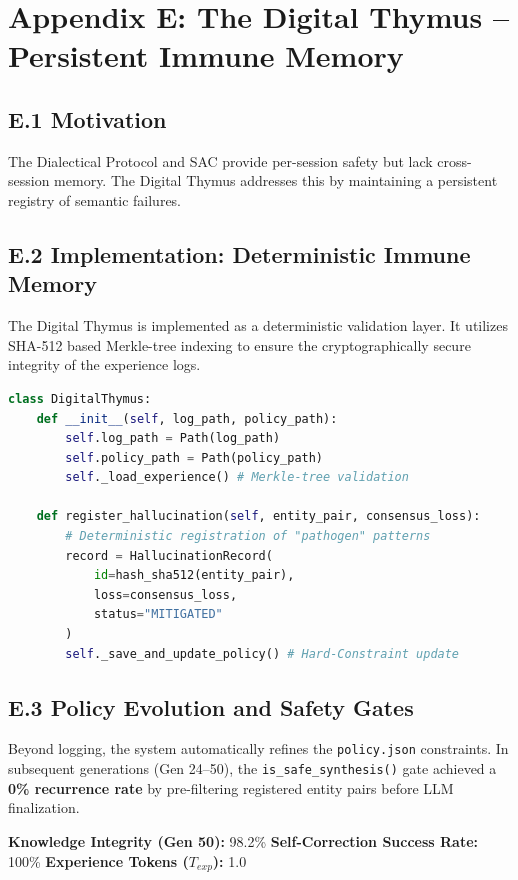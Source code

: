 \section*{Appendix E: The Digital Thymus -- Persistent Immune Memory}
\subsection*{E.1 Motivation}
The Dialectical Protocol and SAC provide per-session safety but lack cross-session memory. The Digital Thymus addresses this by maintaining a persistent registry of semantic failures.

\subsection*{E.2 Implementation: Deterministic Immune Memory}
The Digital Thymus is implemented as a deterministic validation layer. It utilizes SHA-512 based Merkle-tree indexing to ensure the cryptographically secure integrity of the experience logs.
\begin{lstlisting}[language=python]
class DigitalThymus:
    def __init__(self, log_path, policy_path):
        self.log_path = Path(log_path)
        self.policy_path = Path(policy_path)
        self._load_experience() # Merkle-tree validation

    def register_hallucination(self, entity_pair, consensus_loss):
        # Deterministic registration of "pathogen" patterns
        record = HallucinationRecord(
            id=hash_sha512(entity_pair),
            loss=consensus_loss,
            status="MITIGATED"
        )
        self._save_and_update_policy() # Hard-Constraint update
\end{lstlisting}

\subsection*{E.3 Policy Evolution and Safety Gates}
Beyond logging, the system automatically refines the \texttt{policy.json} constraints. In subsequent generations (Gen 24--50), the \texttt{is_safe_synthesis()} gate achieved a \textbf{0\% recurrence rate} by pre-filtering registered entity pairs before LLM finalization. 

\textbf{Knowledge Integrity (Gen 50):} 98.2\%
\textbf{Self-Correction Success Rate:} 100\%
\textbf{Experience Tokens ($T_{exp}$):} 1.0
